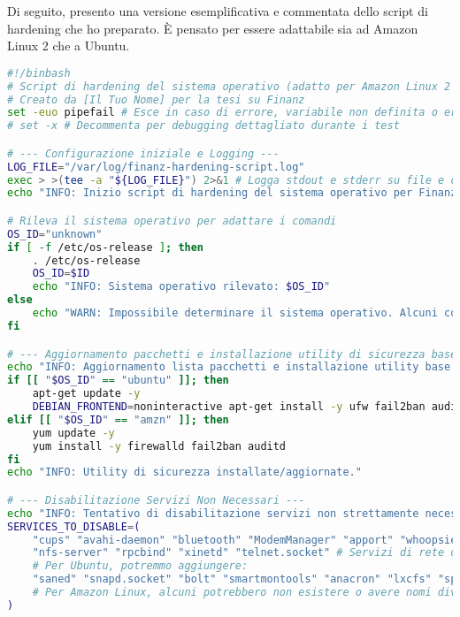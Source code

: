 Di seguito, presento una versione esemplificativa e commentata dello script di hardening che ho preparato. È pensato per essere adattabile sia ad Amazon Linux 2 che a Ubuntu.
    \begin{lstlisting}[language=Bash, style=bash, caption={Script di Hardening del Sistema Operativo (hardening\_script.sh)}, label={lst:hardening_script_cap2}]
#!/binbash
# Script di hardening del sistema operativo (adatto per Amazon Linux 2 e Ubuntu 20.04)
# Creato da [Il Tuo Nome] per la tesi su Finanz
set -euo pipefail # Esce in caso di errore, variabile non definita o errore in una pipe
# set -x # Decommenta per debugging dettagliato durante i test

# --- Configurazione iniziale e Logging ---
LOG_FILE="/var/log/finanz-hardening-script.log"
exec > >(tee -a "${LOG_FILE}") 2>&1 # Logga stdout e stderr su file e console
echo "INFO: Inizio script di hardening del sistema operativo per Finanz - $(date)"

# Rileva il sistema operativo per adattare i comandi
OS_ID="unknown"
if [ -f /etc/os-release ]; then
    . /etc/os-release
    OS_ID=$ID
    echo "INFO: Sistema operativo rilevato: $OS_ID"
else
    echo "WARN: Impossibile determinare il sistema operativo. Alcuni comandi potrebbero fallire."
fi

# --- Aggiornamento pacchetti e installazione utility di sicurezza base ---
echo "INFO: Aggiornamento lista pacchetti e installazione utility base (ufw/firewalld, fail2ban, auditd)..."
if [[ "$OS_ID" == "ubuntu" ]]; then
    apt-get update -y
    DEBIAN_FRONTEND=noninteractive apt-get install -y ufw fail2ban auditd
elif [[ "$OS_ID" == "amzn" ]]; then
    yum update -y
    yum install -y firewalld fail2ban auditd
fi
echo "INFO: Utility di sicurezza installate/aggiornate."

# --- Disabilitazione Servizi Non Necessari ---
echo "INFO: Tentativo di disabilitazione servizi non strettamente necessari..."
SERVICES_TO_DISABLE=(
    "cups" "avahi-daemon" "bluetooth" "ModemManager" "apport" "whoopsie" # Comuni
    "nfs-server" "rpcbind" "xinetd" "telnet.socket" # Servizi di rete datati o specifici
    # Per Ubuntu, potremmo aggiungere:
    "saned" "snapd.socket" "bolt" "smartmontools" "anacron" "lxcfs" "speech-dispatcher" 
    # Per Amazon Linux, alcuni potrebbero non esistere o avere nomi diversi
)


\end{lstlisting}
